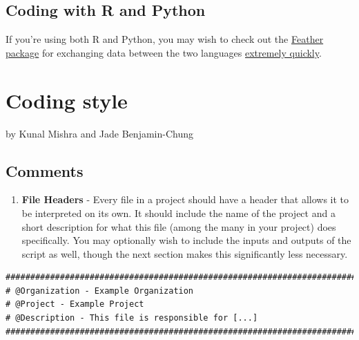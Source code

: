 \documentclass[]{book}
\providecommand{\tightlist}{%
  \setlength{\itemsep}{0pt}\setlength{\parskip}{0pt}}
\begin{document}
\hypertarget{coding-with-r-and-python}{%
\section{Coding with R and Python}\label{coding-with-r-and-python}}

If you're using both R and Python, you may wish to check out the \href{https://www.rdocumentation.org/packages/feather/versions/0.3.3}{Feather package} for exchanging data between the two languages \href{https://blog.rstudio.com/2016/03/29/feather/}{extremely quickly}.

\hypertarget{coding-style}{%
\chapter{Coding style}\label{coding-style}}

by Kunal Mishra and Jade Benjamin-Chung

\hypertarget{comments}{%
\section{Comments}\label{comments}}

\begin{enumerate}
\def\labelenumi{\arabic{enumi}.}
\tightlist
\item
  \textbf{File Headers} - Every file in a project should have a header that allows it to be interpreted on its own. It should include the name of the project and a short description for what this file (among the many in your project) does specifically. You may optionally wish to include the inputs and outputs of the script as well, though the next section makes this significantly less necessary.
\end{enumerate}

\begin{verbatim}
################################################################################
# @Organization - Example Organization
# @Project - Example Project
# @Description - This file is responsible for [...]
################################################################################
\end{verbatim}
\end{document}
